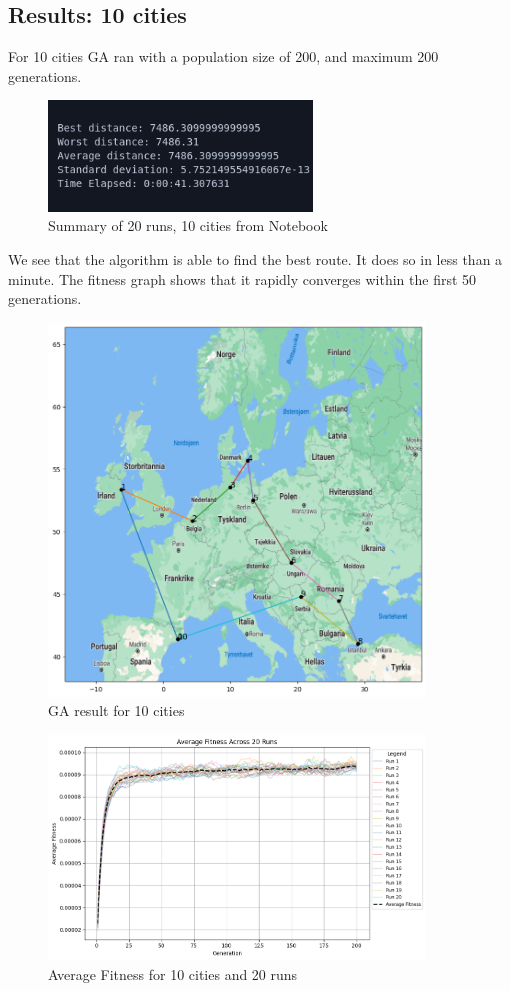 \documentclass{article}
\begin{document}
    \newpage

    \subsection{Results: 10 cities}

    For 10 cities GA ran with a population size of 200, and maximum 200 generations.

    \begin{figure}[ht!]
        \includegraphics[width=7cm]{images/ga_10_cities_summary.png}
        \centering
        \caption{Summary of 20 runs, 10 cities from Notebook}
    \end{figure}

    We see that the algorithm is able to find the best route. It does so in less than a minute.
    The fitness graph shows that it rapidly converges within the first 50 generations.

    \begin{figure}[ht!]
        \includegraphics[width=10cm]{images/ga_10_cities.png}
        \centering
        \caption{GA result for 10 cities}
    \end{figure}

    \begin{figure}[ht!]
        \includegraphics[width=10cm]{images/ga_10_cities_avg_graph.png}
        \centering
        \caption{Average Fitness for 10 cities and 20 runs}
    \end{figure}
\end{document}
